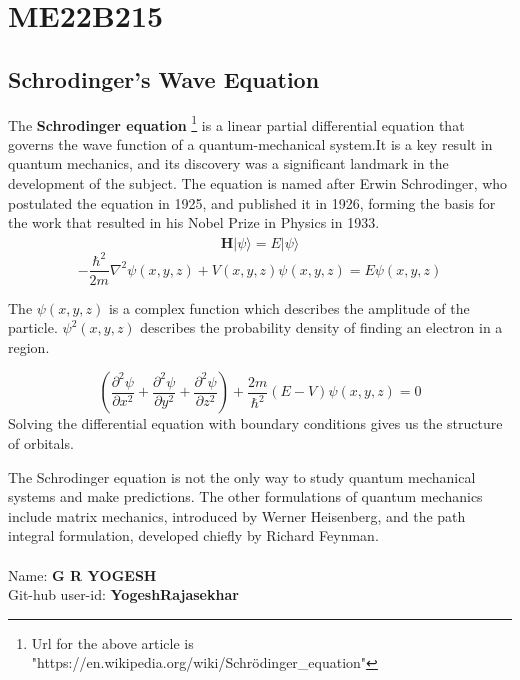 \section{ME22B215}
\subsection{Schrodinger's Wave Equation }
The \textbf{Schrodinger equation} \footnote{Url for the above article is "https://en.wikipedia.org/wiki/Schr\"{o}dinger\_equation"} is a linear partial differential equation that governs the wave function of a quantum-mechanical system.It is a key result in quantum mechanics, and its discovery was a significant landmark in the development of the subject. The equation is named after Erwin Schrodinger, who postulated the equation in 1925, and published it in 1926, forming the basis for the work that resulted in his Nobel Prize in Physics in 1933.
\begin{equation}
    \hat{\textbf{H}} \bigl| \psi\rangle = E\bigl| \psi\rangle
\end{equation}
\begin{equation}
-\frac{\hbar^2}{2m}\nabla^2\psi(x,y,z)+V(x,y,z)\psi(x,y,z)=E\psi(x,y,z)
\end{equation}

The $\psi(x,y,z)$ is a complex function which describes the amplitude of the particle. $\psi^2(x,y,z)$ describes the probability density of finding an electron in a region.

\begin{equation}
(\frac{\partial^2 \psi}{\partial x^2}+\frac{\partial^2 \psi}{\partial y^2}+\frac{\partial^2 \psi}{\partial z^2})+\frac{2m}{\hbar^2}(E-V)\psi(x,y,z)=0
\end{equation}
Solving the differential equation with boundary conditions gives us the structure of orbitals.

The Schrodinger equation is not the only way to study quantum mechanical systems and make predictions. The other formulations of quantum mechanics include matrix mechanics, introduced by Werner Heisenberg, and the path integral formulation, developed chiefly by Richard Feynman.
\\\\
Name: \textbf{G R YOGESH} \\
Git-hub user-id: \textbf{YogeshRajasekhar}
